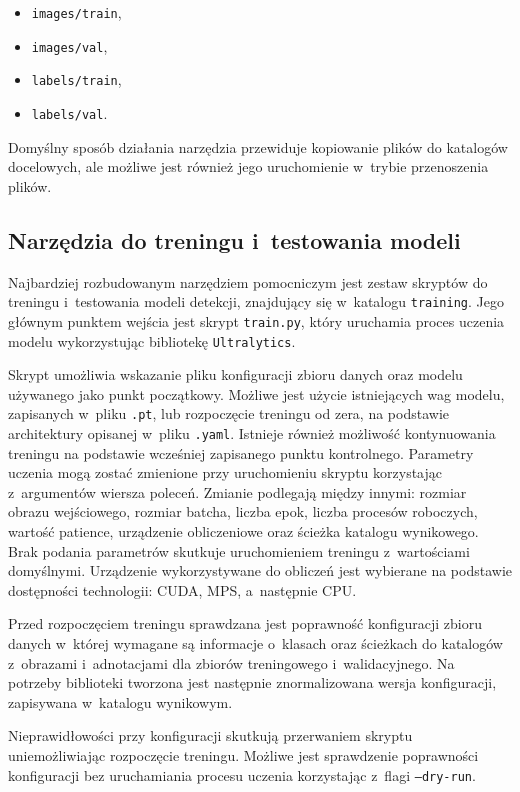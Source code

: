 \begin{itemize}
    \item \texttt{images/train},
    \item \texttt{images/val},
    \item \texttt{labels/train},
    \item \texttt{labels/val}.
\end{itemize}

Domyślny sposób działania narzędzia przewiduje kopiowanie plików do katalogów docelowych, ale możliwe jest również jego uruchomienie w~trybie przenoszenia plików.

\subsection{Narzędzia do treningu i~testowania modeli}

Najbardziej rozbudowanym narzędziem pomocniczym jest zestaw skryptów do treningu i~testowania modeli detekcji, znajdujący się w~katalogu \texttt{training}. Jego głównym punktem wejścia jest skrypt \texttt{train.py}, który uruchamia proces uczenia modelu wykorzystując bibliotekę \texttt{Ultralytics}.

Skrypt umożliwia wskazanie pliku konfiguracji zbioru danych oraz modelu używanego jako punkt początkowy. Możliwe jest użycie istniejących wag modelu, zapisanych w~pliku \texttt{.pt}, lub rozpoczęcie treningu od zera, na podstawie architektury opisanej w~pliku \texttt{.yaml}. Istnieje również możliwość kontynuowania treningu na podstawie wcześniej zapisanego punktu kontrolnego. Parametry uczenia mogą zostać zmienione przy uruchomieniu skryptu korzystając z~argumentów wiersza poleceń. Zmianie podlegają między innymi: rozmiar obrazu wejściowego, rozmiar batcha, liczba epok, liczba procesów roboczych, wartość patience, urządzenie obliczeniowe oraz ścieżka katalogu wynikowego. Brak podania parametrów skutkuje uruchomieniem treningu z~wartościami domyślnymi. Urządzenie wykorzystywane do obliczeń jest wybierane na podstawie dostępności technologii: CUDA, MPS, a~następnie CPU.

Przed rozpoczęciem treningu sprawdzana jest poprawność konfiguracji zbioru danych w~której wymagane są informacje o~klasach oraz ścieżkach do katalogów z~obrazami i~adnotacjami dla zbiorów treningowego i~walidacyjnego. Na potrzeby biblioteki tworzona jest następnie znormalizowana wersja konfiguracji, zapisywana w~katalogu wynikowym.

Nieprawidłowości przy konfiguracji skutkują przerwaniem skryptu uniemożliwiając rozpoczęcie treningu. Możliwe jest sprawdzenie poprawności konfiguracji bez uruchamiania procesu uczenia korzystając z~flagi \texttt{--dry-run}.


